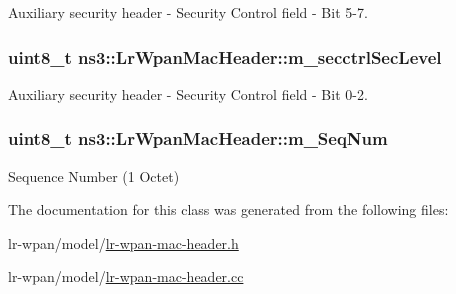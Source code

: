 Auxiliary security header -\/ Security Control field -\/ Bit 5-\/7. 

\subsubsection[{\texorpdfstring{m\+\_\+secctrl\+Sec\+Level}{m_secctrlSecLevel}}]{\setlength{\rightskip}{0pt plus 5cm}uint8\+\_\+t ns3\+::\+Lr\+Wpan\+Mac\+Header\+::m\+\_\+secctrl\+Sec\+Level\hspace{0.3cm}{\ttfamily [private]}}\hypertarget{classns3_1_1LrWpanMacHeader_a00e41e9c9cefeeac16a515dc53456fdc}{}\label{classns3_1_1LrWpanMacHeader_a00e41e9c9cefeeac16a515dc53456fdc}


Auxiliary security header -\/ Security Control field -\/ Bit 0-\/2. 

\subsubsection[{\texorpdfstring{m\+\_\+\+Seq\+Num}{m_SeqNum}}]{\setlength{\rightskip}{0pt plus 5cm}uint8\+\_\+t ns3\+::\+Lr\+Wpan\+Mac\+Header\+::m\+\_\+\+Seq\+Num\hspace{0.3cm}{\ttfamily [private]}}\hypertarget{classns3_1_1LrWpanMacHeader_a122f0fd68833fcdeff7908327b6c5dcc}{}\label{classns3_1_1LrWpanMacHeader_a122f0fd68833fcdeff7908327b6c5dcc}


Sequence Number (1 Octet) 



The documentation for this class was generated from the following files\+:\begin{DoxyCompactItemize}
\item 
lr-\/wpan/model/\hyperlink{lr-wpan-mac-header_8h}{lr-\/wpan-\/mac-\/header.\+h}\item 
lr-\/wpan/model/\hyperlink{lr-wpan-mac-header_8cc}{lr-\/wpan-\/mac-\/header.\+cc}\end{DoxyCompactItemize}
